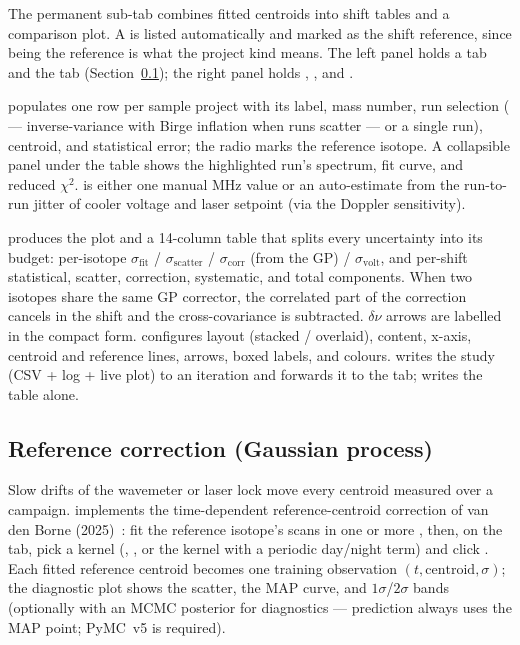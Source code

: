 The permanent  sub-tab
combines fitted centroids into shift tables and a comparison plot. A
 is listed automatically and marked as the
shift reference, since being the reference is what the project kind
means. The
left panel holds a  tab and the
 tab
(Section~\ref{sec:analysis_gp}); the right panel holds ,
, and .

 populates one row per sample project
with its label, mass number, run selection (
--- inverse-variance with Birge inflation when runs scatter --- or a
single run), centroid, and statistical error; the  radio
marks the reference isotope. A collapsible  panel
under the table shows the highlighted run's spectrum, fit curve, and
reduced $\chi^2$.  is either one manual MHz
value or an auto-estimate from the run-to-run jitter of cooler
voltage and laser setpoint (via the Doppler sensitivity).

 produces the plot and a 14-column table that
splits every uncertainty into its budget: per-isotope
$\sigma_{\mathrm{fit}}$ / $\sigma_{\mathrm{scatter}}$ /
$\sigma_{\mathrm{corr}}$ (from the GP) / $\sigma_{\mathrm{volt}}$,
and per-shift statistical, scatter, correction, systematic, and
total components. When two isotopes share the same GP corrector,
the correlated part of the correction cancels in the shift and the
cross-covariance is subtracted. $\delta\nu$ arrows are labelled in
the compact  form. 
configures layout (stacked / overlaid), content, x-axis, centroid
and reference lines, arrows, boxed labels, and colours.
 writes the study (CSV + log + live plot) to an
 iteration and forwards it to the 
tab;  writes the table alone.

\subsection{Reference correction (Gaussian process)}
\label{sec:analysis_gp}

Slow drifts of the wavemeter or laser lock move every centroid
measured over a campaign. \denis{} implements the time-dependent
reference-centroid correction of van den Borne
(2025)~\cite{vandenborne2025}: fit the reference isotope's scans in
one or more , then, on the
 tab, pick a kernel
(, , or the
 kernel with a periodic day/night term) and click
. Each fitted reference centroid becomes one training
observation $(t, \mathrm{centroid}, \sigma)$; the diagnostic plot
shows the scatter, the MAP curve, and $1\sigma$/$2\sigma$ bands
(optionally with an MCMC posterior for diagnostics --- prediction
always uses the MAP point; PyMC~v5 is required).


